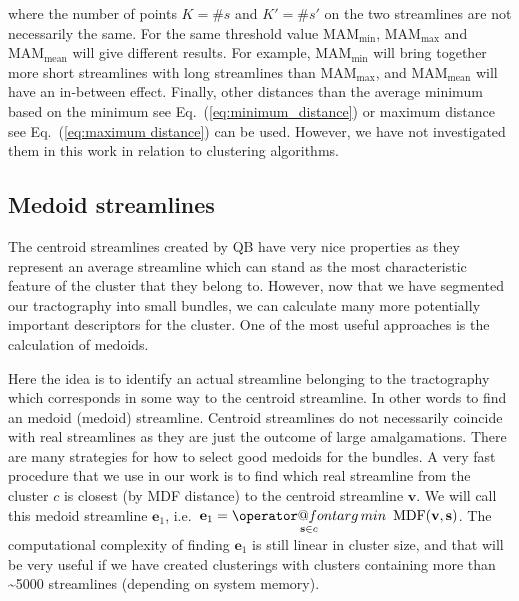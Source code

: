 \documentclass{bioinfo}
\makeatletter
\def\argmin{\mathop{\operator@font arg\,min}}
\makeatother
\begin{document}
\begin{methods}
\noindent
where the number of points $K=\#s$ and $K'=\#s'$ on the two streamlines
are not necessarily the same. For the same threshold value
$\textrm{MAM}_{\textrm{min}}$, $\textrm{MAM}_{\textrm{max}}$ and
$\textrm{MAM}_{\textrm{mean}}$ will give different results. For example,
$\textrm{MAM}_{\textrm{min}}$ will bring together more short streamlines
with long streamlines than $\textrm{MAM}_{\textrm{max}}$, and
$\textrm{MAM}_{\textrm{mean}}$ will have an in-between effect. Finally,
other distances than the average minimum based on the minimum see
Eq.~(\ref{eq:minimum_distance}) or maximum distance see
Eq.~(\ref{eq:maximum distance}) can be used.  However, we have not
investigated them in this work in relation to clustering algorithms.

\subsection{Medoid streamlines\label{sub:medoids}}

The centroid streamlines created by QB have very nice properties as they
represent an average streamline which can stand as the most
characteristic feature of the cluster that they belong to. However, now
that we have segmented our tractography into small bundles, we can
calculate many more potentially important descriptors for the
cluster. One of the most useful approaches is the calculation of
medoids.

Here the idea is to identify an actual streamline belonging to the
tractography which corresponds in some way to the centroid streamline. In
other words to find an medoid (medoid) streamline. Centroid streamlines
do not necessarily coincide with real streamlines as they are just the
outcome of large amalgamations. There are many strategies for how to
select good medoids for the bundles. A very fast procedure that we use
in our work is to find which real streamline from the cluster $c$ is
closest (by MDF distance) to the centroid streamline $\mathbf{v}$. We
will call this medoid streamline $\mathbf{e}_{1}$,
i.e.~$\mathbf{e}_{1}={\displaystyle \argmin_{\mathbf{s} \in
    c}}\textrm{\,\ MDF}(\mathbf{v},\mathbf{s})$.  The computational
complexity of finding $\mathbf{e}_{1}$ is still linear in cluster size,
and that will be very useful if we have created clusterings with
clusters containing more than \textasciitilde5000 streamlines (depending
on system memory).


\end{methods}
\end{document}
